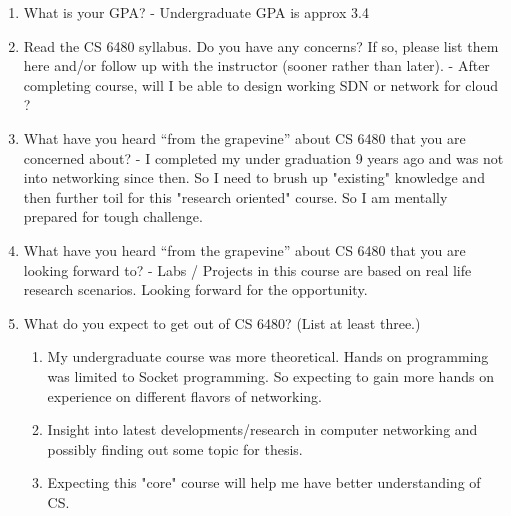 \documentclass{article}
\begin{document}
\begin{enumerate}
\item What is your GPA? - Undergraduate GPA is approx 3.4 

\item Read the CS 6480 syllabus. Do you have any concerns? If so, please
list them here and/or follow up with the instructor (sooner rather than
later). - After completing course, will I be able to design working SDN or network for cloud ?

\item What have you heard ``from the grapevine'' about CS 6480 that you are
concerned about? - I completed my under graduation 9 years ago and was not into networking since then. So I need to brush up "existing" knowledge and then further toil for this "research oriented" course. So I am  mentally prepared for tough challenge. 

\item What have you heard ``from the grapevine'' about CS 6480 that you are
looking forward to? - Labs / Projects in this course are based on real life research scenarios. Looking forward for the opportunity.

\item What do you expect to get out of CS 6480? (List at least three.)
\begin{enumerate}
\item My undergraduate course was more theoretical. Hands on programming was limited to Socket programming. So expecting to gain more hands on experience on different flavors of networking.
\item Insight into latest developments/research in computer networking and possibly finding out some topic for thesis.
\item Expecting this "core" course will help me have better understanding of CS.

\end{enumerate}
\end{enumerate}
\end{document}
